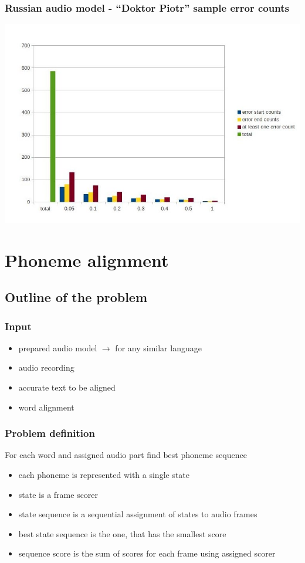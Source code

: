 \documentclass[]{beamer}
\begin{document}
\begin{frame}
    \frametitle{Russian audio model - “Doktor Piotr” sample error counts}
    \includegraphics[scale=0.37]{doktor_piotr_word_russian_results.jpg}
\end{frame}

\section{Phoneme alignment}
\subsection{Outline of the problem}
\begin{frame}
    \frametitle{Input}
    \begin{itemize}
        \item prepared audio model $\rightarrow$ for any similar language
        \item audio recording
        \item accurate text to be aligned
        \item word alignment
    \end{itemize}
\end{frame}
\begin{frame}
    \frametitle{Problem definition}
    For each word and assigned audio part find best phoneme sequence
    \begin{itemize}
        \item each phoneme is represented with a single state
        \item state is a frame scorer
        \item state sequence is a sequential assignment of states to audio frames
        \item best state sequence is the one, that has the smallest score
        \item sequence score is the sum of scores for each frame using assigned scorer
    \end{itemize}
\end{frame}
\end{document}

